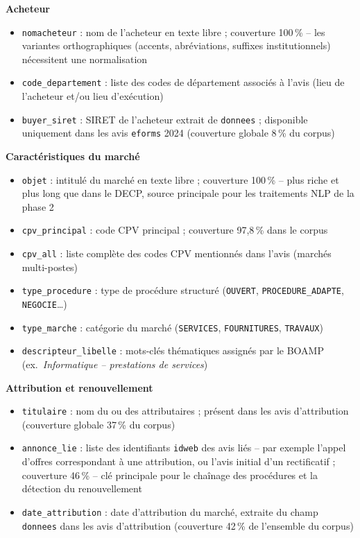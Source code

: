 \documentclass[12pt,a4paper]{article}
\begin{document}
\medskip
\textbf{Acheteur}

\begin{itemize}
  \item[---] \texttt{nomacheteur} : nom de l'acheteur en texte libre ;
    couverture 100\,\% -- les variantes orthographiques (accents,
    abréviations, suffixes institutionnels) nécessitent une normalisation
  \item[---] \texttt{code\_departement} : liste des codes de département
    associés à l'avis (lieu de l'acheteur et/ou lieu d'exécution)
  \item[---] \texttt{buyer\_siret} : SIRET de l'acheteur extrait de
    \texttt{donnees} ; disponible uniquement dans les avis \texttt{eforms}
    2024 (couverture globale 8\,\% du corpus)
\end{itemize}

\medskip
\textbf{Caractéristiques du marché}

\begin{itemize}
  \item[---] \texttt{objet} : intitulé du marché en texte libre ; couverture
    100\,\% -- plus riche et plus long que dans le DECP, source principale
    pour les traitements NLP de la phase 2
  \item[---] \texttt{cpv\_principal} : code CPV principal ; couverture
    97,8\,\% dans le corpus
  \item[---] \texttt{cpv\_all} : liste complète des codes CPV mentionnés dans
    l'avis (marchés multi-postes)
  \item[---] \texttt{type\_procedure} : type de procédure structuré
    (\texttt{OUVERT}, \texttt{PROCEDURE\_ADAPTE}, \texttt{NEGOCIE}\ldots)
  \item[---] \texttt{type\_marche} : catégorie du marché (\texttt{SERVICES},
    \texttt{FOURNITURES}, \texttt{TRAVAUX})
  \item[---] \texttt{descripteur\_libelle} : mots-clés thématiques assignés
    par le BOAMP (ex.\ \textit{Informatique -- prestations de services})
\end{itemize}

\medskip
\textbf{Attribution et renouvellement}

\begin{itemize}
  \item[---] \texttt{titulaire} : nom du ou des attributaires ; présent
    dans les avis d'attribution (couverture globale 37\,\% du corpus)
  \item[---] \texttt{annonce\_lie} : liste des identifiants \texttt{idweb}
    des avis liés -- par exemple l'appel d'offres correspondant à une
    attribution, ou l'avis initial d'un rectificatif ; couverture 46\,\% --
    clé principale pour le chaînage des procédures et la détection du
    renouvellement
  \item[---] \texttt{date\_attribution} : date d'attribution du marché,
    extraite du champ \texttt{donnees} dans les avis d'attribution
    (couverture 42\,\% de l'ensemble du corpus)
\end{itemize}
\end{document}
